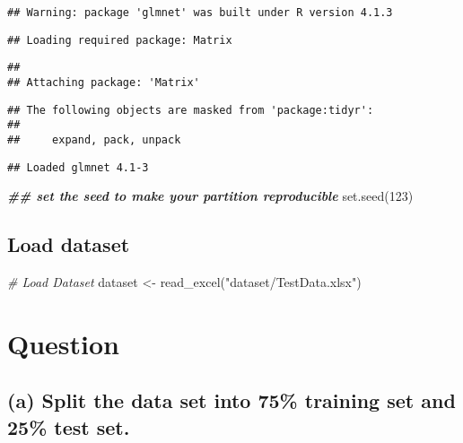 \documentclass[
]{article}
\newenvironment{Shaded}{\begin{snugshade}}{\end{snugshade}}
\newcommand{\CommentTok}[1]{\textcolor[rgb]{0.56,0.35,0.01}{\textit{#1}}}
\newcommand{\DecValTok}[1]{\textcolor[rgb]{0.00,0.00,0.81}{#1}}
\newcommand{\DocumentationTok}[1]{\textcolor[rgb]{0.56,0.35,0.01}{\textbf{\textit{#1}}}}
\newcommand{\FunctionTok}[1]{\textcolor[rgb]{0.00,0.00,0.00}{#1}}
\newcommand{\NormalTok}[1]{#1}
\newcommand{\OtherTok}[1]{\textcolor[rgb]{0.56,0.35,0.01}{#1}}
\newcommand{\StringTok}[1]{\textcolor[rgb]{0.31,0.60,0.02}{#1}}
\begin{document}
\begin{verbatim}
## Warning: package 'glmnet' was built under R version 4.1.3
\end{verbatim}

\begin{verbatim}
## Loading required package: Matrix
\end{verbatim}

\begin{verbatim}
## 
## Attaching package: 'Matrix'
\end{verbatim}

\begin{verbatim}
## The following objects are masked from 'package:tidyr':
## 
##     expand, pack, unpack
\end{verbatim}

\begin{verbatim}
## Loaded glmnet 4.1-3
\end{verbatim}

\begin{Shaded}
\begin{Highlighting}[]
\DocumentationTok{\#\# set the seed to make your partition reproducible}
\FunctionTok{set.seed}\NormalTok{(}\DecValTok{123}\NormalTok{)}
\end{Highlighting}
\end{Shaded}

\hypertarget{load-dataset}{%
\subsection{Load dataset}\label{load-dataset}}

\begin{Shaded}
\begin{Highlighting}[]
\CommentTok{\# Load Dataset}
\NormalTok{dataset }\OtherTok{\textless{}{-}} \FunctionTok{read\_excel}\NormalTok{(}\StringTok{"dataset/TestData.xlsx"}\NormalTok{)}
\end{Highlighting}
\end{Shaded}

\hypertarget{question}{%
\section{Question}\label{question}}

\hypertarget{a-split-the-data-set-into-75-training-set-and-25-test-set.}{%
\subsection{(a) Split the data set into 75\% training set and 25\% test
set.}\label{a-split-the-data-set-into-75-training-set-and-25-test-set.}}
\end{document}
